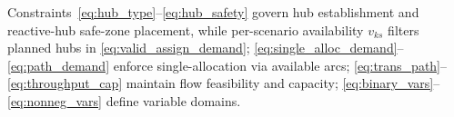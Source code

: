 \documentclass{llncs}
\begin{document}
Constraints~\eqref{eq:hub_type}--\eqref{eq:hub_safety} govern hub establishment and reactive-hub safe-zone placement, while per-scenario availability $v_{ks}$ filters planned hubs in \eqref{eq:valid_assign_demand}; \eqref{eq:single_alloc_demand}--\eqref{eq:path_demand} enforce single-allocation via available arcs; \eqref{eq:trans_path}--\eqref{eq:throughput_cap} maintain flow feasibility and capacity; \eqref{eq:binary_vars}--\eqref{eq:nonneg_vars} define variable domains.




\end{document}
